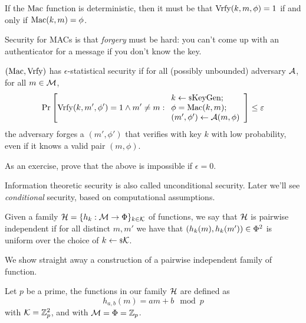 If the $\mathrm{Mac}$ function is deterministic, then it must be that $\mathrm{Vrfy}(k, m, \phi) = 1$ if and only if $\mathrm{Mac}(k, m) = \phi$.

Security for \acp{MAC} is that \emph{forgery} must be hard: you can't come up with an authenticator for a message if you don't know the key.

\begin{definition}
	$(\mathrm{Mac}, \mathrm{Vrfy})$ has $\epsilon$-statistical security if for all (possibly unbounded) adversary $\mathcal{A}$, for all $m \in \mathcal{M}$,
	\begin{equation*}
		\mathop{\mathrm{Pr}}\limits_{} \left[ {
			\mathrm{Vrfy}(k, m', \phi') = 1 \land m' \neq m :
			\begin{array}{l}
				k \leftarrow {\scriptstyle \$} {\mathrm{KeyGen}}; \; \\
				\phi = \mathrm{Mac}(k,m); \; \\
				(m', \phi') \leftarrow \mathcal{A}(m,\phi)
			\end{array}
		} \right] \le \varepsilon
	\end{equation*}
	\ie the adversary forges a $(m',\phi')$ that verifies with key $k$ with low probability, even if it knows a valid pair $(m, \phi)$.
\end{definition}

As an exercise, prove that the above is impossible if $\epsilon = 0$.

Information theoretic security is also called unconditional security.
Later we'll see \emph{conditional} security, based on computational assumptions.

\begin{definition}
	Given a family $\mathcal{H} = \{ h_k : \mathcal{M} \to \Phi \}_{k \in \mathcal{K}}$ of functions, we say that $\mathcal{H}$ is pairwise independent if for all distinct $m, m'$ we have that $(h_k(m), h_k(m')) \in \Phi^2$ is uniform over the choice of $k \leftarrow {\scriptstyle \$} {\mathcal{K}}$.
\end{definition}

We show straight away a construction of a pairwise independent family of function.
\begin{construction} \label{cons:pairwise-independent}
	Let $p$ be a prime, the functions in our family $\mathcal{H}$ are defined as
	\begin{equation*}
		h_{a,b}(m) = a m + b \mod p
	\end{equation*}
	with $\mathcal{K} = \mathbb{Z}^2_p$, and with $\mathcal{M} = \Phi = \mathbb{Z}_p$.
\end{construction}

